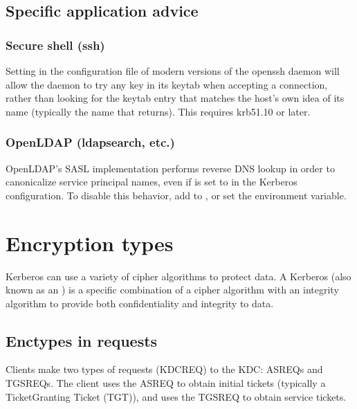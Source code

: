 \documentclass[letterpaper,10pt,english]{sphinxmanual}
\begin{document}
\section{Specific application advice}
\label{\detokenize{admin/princ_dns:specific-application-advice}}

\subsection{Secure shell (ssh)}
\label{\detokenize{admin/princ_dns:secure-shell-ssh}}
\sphinxAtStartPar
Setting  in the configuration file
of modern versions of the openssh daemon will allow the daemon to try
any key in its keytab when accepting a connection, rather than looking
for the keytab entry that matches the host’s own idea of its name
(typically the name that  returns).  This requires
krb5\sphinxhyphen{}1.10 or later.


\subsection{OpenLDAP (ldapsearch, etc.)}
\label{\detokenize{admin/princ_dns:openldap-ldapsearch-etc}}
\sphinxAtStartPar
OpenLDAP’s SASL implementation performs reverse DNS lookup in order to
canonicalize service principal names, even if  is set to
 in the Kerberos configuration.  To disable this behavior,
add  to , or set the
 environment variable.


\chapter{Encryption types}
\label{\detokenize{admin/enctypes:encryption-types}}\label{\detokenize{admin/enctypes:enctypes}}\label{\detokenize{admin/enctypes::doc}}
\sphinxAtStartPar
Kerberos can use a variety of cipher algorithms to protect data.  A
Kerberos  (also known as an ) is a
specific combination of a cipher algorithm with an integrity algorithm
to provide both confidentiality and integrity to data.


\section{Enctypes in requests}
\label{\detokenize{admin/enctypes:enctypes-in-requests}}
\sphinxAtStartPar
Clients make two types of requests (KDC\sphinxhyphen{}REQ) to the KDC: AS\sphinxhyphen{}REQs and
TGS\sphinxhyphen{}REQs.  The client uses the AS\sphinxhyphen{}REQ to obtain initial tickets
(typically a Ticket\sphinxhyphen{}Granting Ticket (TGT)), and uses the TGS\sphinxhyphen{}REQ to
obtain service tickets.
\end{document}
